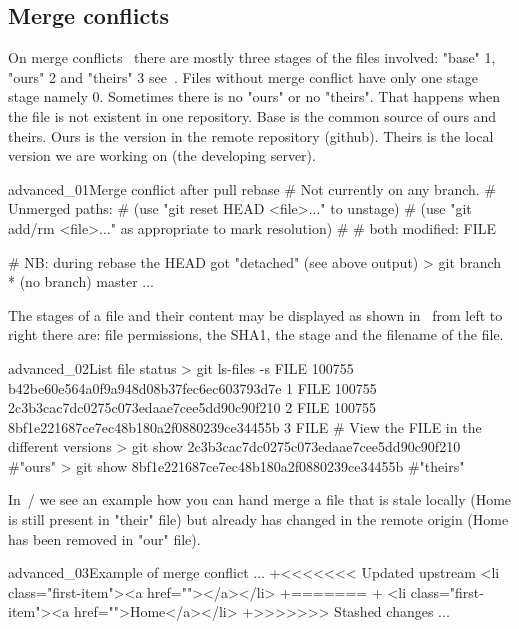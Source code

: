 \subsection{Merge conflicts}
On merge conflicts~ there are mostly three stages of the files involved: "base" 1, "ours" 2 and "theirs" 3 see~. Files without merge conflict have only one stage stage namely 0. Sometimes there is no "ours" or no "theirs". That happens when the file is not existent in one repository. Base is the common source of ours and theirs. Ours is the version in the remote repository (github). Theirs is the local version we are working on (the developing server).
\begin{codelisting}{advanced_01}{Merge conflict after pull rebase}
# Not currently on any branch.
# Unmerged paths:
#   (use "git reset HEAD <file>..." to unstage)
#   (use "git add/rm <file>..." as appropriate to mark resolution)
#
#       both modified:    FILE

# NB: during rebase the HEAD got "detached" (see above output)
> git branch
* (no branch)
  master
...
\end{codelisting}
The stages of a file and their content may be displayed as shown in~ from left to right there are: file permissions, the SHA1, the stage and the filename of the file.
\begin{codelisting}{advanced_02}{List file status}
> git ls-files -s FILE
100755 b42be60e564a0f9a948d08b37fec6ec603793d7e 1       FILE
100755 2c3b3cac7dc0275c073edaae7cee5dd90c90f210 2       FILE
100755 8bf1e221687ce7ec48b180a2f0880239ce34455b 3       FILE
# View the FILE in the different versions
> git show 2c3b3cac7dc0275c073edaae7cee5dd90c90f210 #"ours"
> git show 8bf1e221687ce7ec48b180a2f0880239ce34455b #"theirs"
\end{codelisting}
In~/ we see an example how you can hand merge a file that is stale locally (Home is still present in "their" file) but already has changed in the remote origin (Home has been removed in "our" file).
\begin{codelisting}{advanced_03}{Example of merge conflict}
...
+<<<<<<< Updated upstream                                                                                                                                                                                                                    
    <li class="first-item"><a href=""></a></li>
+=======                                                                                                                                                                                                                                     
+   <li class="first-item"><a href="">Home</a></li>                                                                                                                                                              
+>>>>>>> Stashed changes
...
\end{codelisting}
